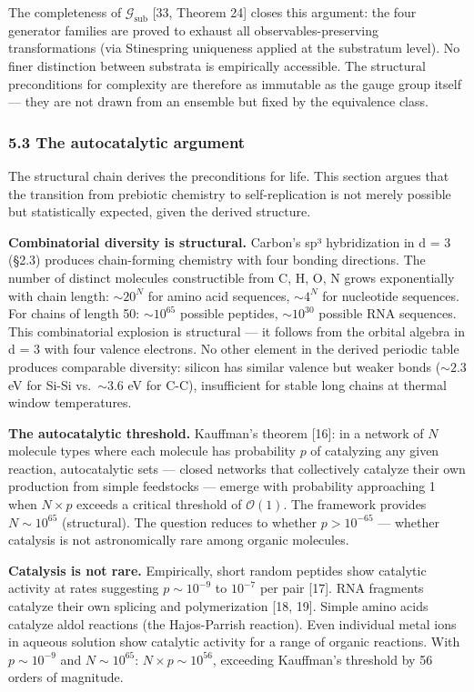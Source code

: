 \documentclass[
]{article}
\begin{document}
The completeness of \(\mathcal{G}_{\text{sub}}\) {[}33, Theorem 24{]}
closes this argument: the four generator families are proved to exhaust
all observables-preserving transformations (via Stinespring uniqueness
applied at the substratum level). No finer distinction between substrata
is empirically accessible. The structural preconditions for complexity
are therefore as immutable as the gauge group itself --- they are not
drawn from an ensemble but fixed by the equivalence class.

\hypertarget{the-autocatalytic-argument}{%
\subsubsection{5.3 The autocatalytic
argument}\label{the-autocatalytic-argument}}

The structural chain derives the preconditions for life. This section
argues that the transition from prebiotic chemistry to self-replication
is not merely possible but statistically expected, given the derived
structure.

\textbf{Combinatorial diversity is structural.} Carbon's sp³
hybridization in d = 3 (§2.3) produces chain-forming chemistry with four
bonding directions. The number of distinct molecules constructible from
C, H, O, N grows exponentially with chain length: \(\sim 20^N\) for
amino acid sequences, \(\sim 4^N\) for nucleotide sequences. For chains
of length 50: \(\sim 10^{65}\) possible peptides, \(\sim 10^{30}\)
possible RNA sequences. This combinatorial explosion is structural ---
it follows from the orbital algebra in d = 3 with four valence
electrons. No other element in the derived periodic table produces
comparable diversity: silicon has similar valence but weaker bonds
(\(\sim 2.3\) eV for Si-Si vs.~\(\sim 3.6\) eV for C-C), insufficient
for stable long chains at thermal window temperatures.

\textbf{The autocatalytic threshold.} Kauffman's theorem {[}16{]}: in a
network of \(N\) molecule types where each molecule has probability
\(p\) of catalyzing any given reaction, autocatalytic sets --- closed
networks that collectively catalyze their own production from simple
feedstocks --- emerge with probability approaching 1 when \(N \times p\)
exceeds a critical threshold of \(\mathcal{O}(1)\). The framework
provides \(N \sim 10^{65}\) (structural). The question reduces to
whether \(p > 10^{-65}\) --- whether catalysis is not astronomically
rare among organic molecules.

\textbf{Catalysis is not rare.} Empirically, short random peptides show
catalytic activity at rates suggesting \(p \sim 10^{-9}\) to \(10^{-7}\)
per pair {[}17{]}. RNA fragments catalyze their own splicing and
polymerization {[}18, 19{]}. Simple amino acids catalyze aldol reactions
(the Hajos-Parrish reaction). Even individual metal ions in aqueous
solution show catalytic activity for a range of organic reactions. With
\(p \sim 10^{-9}\) and \(N \sim 10^{65}\): \(N \times p \sim 10^{56}\),
exceeding Kauffman's threshold by 56 orders of magnitude.
\end{document}
